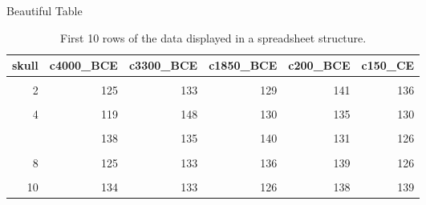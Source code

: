 \begin{table}[!h]
\centering
\caption{Beautiful Table}
\centering
\begin{tabular}[t]{rrrrrr}
\toprule
skull & c4000\_BCE & c3300\_BCE & c1850\_BCE & c200\_BCE & c150\_CE\\
\midrule
\cellcolor{gray!10}{1} & \cellcolor{gray!10}{131} & \cellcolor{gray!10}{124} & \cellcolor{gray!10}{137} & \cellcolor{gray!10}{137} & \cellcolor{gray!10}{137}\\
2 & 125 & 133 & 129 & 141 & 136\\
\cellcolor{gray!10}{3} & \cellcolor{gray!10}{131} & \cellcolor{gray!10}{138} & \cellcolor{gray!10}{132} & \cellcolor{gray!10}{141} & \cellcolor{gray!10}{128}\\
4 & 119 & 148 & 130 & 135 & 130\\
\cellcolor{gray!10}{5} & \cellcolor{gray!10}{136} & \cellcolor{gray!10}{126} & \cellcolor{gray!10}{134} & \cellcolor{gray!10}{133} & \cellcolor{gray!10}{138}\\
\addlinespace
6 & 138 & 135 & 140 & 131 & 126\\
\cellcolor{gray!10}{7} & \cellcolor{gray!10}{139} & \cellcolor{gray!10}{132} & \cellcolor{gray!10}{138} & \cellcolor{gray!10}{140} & \cellcolor{gray!10}{136}\\
8 & 125 & 133 & 136 & 139 & 126\\
\cellcolor{gray!10}{9} & \cellcolor{gray!10}{131} & \cellcolor{gray!10}{131} & \cellcolor{gray!10}{136} & \cellcolor{gray!10}{140} & \cellcolor{gray!10}{132}\\
10 & 134 & 133 & 126 & 138 & 139\\
\bottomrule
\end{tabular}
\vspace{1em}
\caption{First 10 rows of the  data displayed in a spreadsheet structure.}
\label{table:mm_madison}
\end{table}